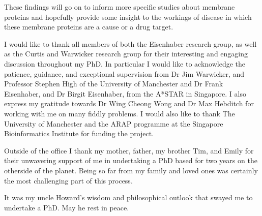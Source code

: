 \documentclass[12pt,PhD,twoside]{muthesis}
\begin{document}
These findings will go on to inform more specific studies about membrane proteins and hopefully provide some insight to the workings of disease in which these membrane proteins are a cause or a drug target.





\afterabstract{} %

I would like to thank all members of both the Eisenhaber research group, as well as the Curtis and Warwicker research group for their interesting and engaging discussion throughout my PhD.
In particular I would like to acknowledge the patience, guidance, and exceptional supervision from Dr Jim Warwicker, and Professor Stephen High of the University of Manchester and Dr Frank Eisenhaber, and Dr Birgit Eisenhaber, from the A*STAR in Singapore.
I also express my gratitude towards Dr Wing Cheong Wong and Dr Max Hebditch for working with me on many fiddly problems.
I would also like to thank The University of Manchester and the ARAP programme at the Singapore Bioinformatics Institute for funding the project.

Outside of the office I thank my mother, father, my brother Tim, and Emily for their unwavering support of me in undertaking a PhD based for two years on the otherside of the planet.
Being so far from my family and loved ones was certainly the most challenging part of this process.

It was my uncle Howard's wisdom and philosophical outlook that swayed me to undertake a PhD.
May he rest in peace.



\end{document}
